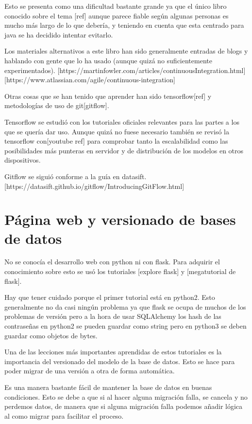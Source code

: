 Esto se presenta como una dificultad bastante grande ya que el único libro conocido sobre el tema [ref] aunque parece fiable según algunas personas es mucho más largo de lo que debería, y teniendo en cuenta que esta centrado para java se ha decidido intentar evitarlo.

Los materiales alternativos a este libro han sido  generalmente entradas de blogs y hablando con gente que lo ha usado (aunque quizá no suficientemente experimentados). [https://martinfowler.com/articles/continuousIntegration.html]
[https://www.atlassian.com/agile/continuous-integration]

Otras cosas que se han tenido que aprender han sido tensorflow[ref] y metodologías de uso de git[gitflow]. 

Tensorflow se estudió con los tutoriales oficiales relevantes para las partes a los que se quería dar uso. Aunque quizá no fuese necesario también se revisó la tensorflow con[youtube ref] para comprobar tanto la escalabilidad como las posibilidades más punteras en servidor y de distribución de los modelos en otros dispositivos.

Gitflow se siguió conforme a la guía en datasift. [https://datasift.github.io/gitflow/IntroducingGitFlow.html] 


\section{Página web y versionado de bases de datos}

No se conocía el desarrollo web con python ni con flask. Para adquirir el conocimiento sobre esto se usó los tutoriales [explore flask] y [megatutorial de flask].

Hay que tener cuidado porque el primer tutorial está en python2. Esto generalmente no da casi ningún problema ya que flask se ocupa de muchos de los problemas de versión pero a la hora de usar SQLAlchemy los hash de las contraseñas en python2 se pueden guardar como string pero en python3 se deben guardar como objetos de bytes.

Una de las lecciones más importantes aprendidas de estos tutoriales es la importancia del versionado del modelo de la base de datos. Esto se hace para poder migrar de una versión a otra de forma automática. 

Es una manera bastante fácil de mantener la base de datos en buenas condiciones. Esto se debe a que si al hacer alguna migración falla, se cancela y no perdemos datos, de manera que si alguna migración falla podemos añadir lógica al como migrar para facilitar el proceso.

